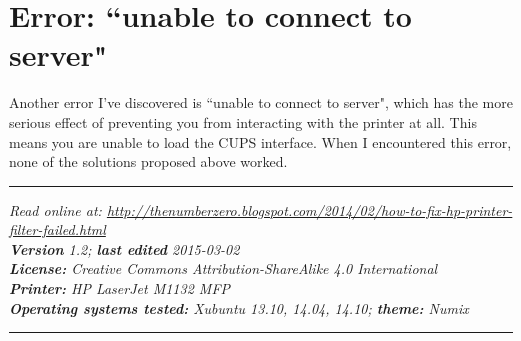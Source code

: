 \documentclass[12pt, a4paper]{article}
\begin{document}
\section*{Error: ``unable to connect to server"}

Another error I've discovered is ``unable to connect to server", which has the more serious effect of preventing you from interacting with the printer at all. This means you are unable to load the CUPS interface. When I encountered this error, none of the solutions proposed above worked.












\vspace{4cm}
\hrule
\noindent \center \emph{Read online at: \url{http://thenumberzero.blogspot.com/2014/02/how-to-fix-hp-printer-filter-failed.html}\\
\textbf{Version} 1.2; \textbf{last edited} 2015-03-02\\
\textbf{License:} Creative Commons Attribution-ShareAlike 4.0 International\\
\textbf{Printer:} HP LaserJet M1132 MFP\\
\textbf{Operating systems tested:} Xubuntu 13.10, 14.04, 14.10; \textbf{theme:} Numix}
\vspace{1em}
\hrule
\end{document}
